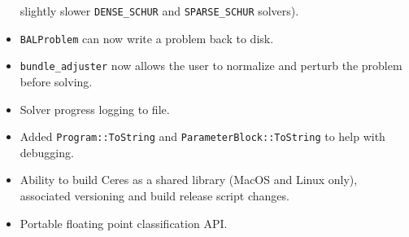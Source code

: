 \begin{itemize}
  slightly slower \texttt{DENSE\_SCHUR} and \texttt{SPARSE\_SCHUR} solvers).
\item \texttt{BALProblem} can now write a problem back to disk.
\item \texttt{bundle\_adjuster} now allows the user to normalize and perturb the
  problem before solving.
\item Solver progress logging to file.
\item Added \texttt{Program::ToString} and
  \texttt{ParameterBlock::ToString}  to help with debugging.
\item Ability to build Ceres as a shared library (MacOS and Linux only), associated versioning and build release script changes.
\item Portable floating point classification API.
\end{itemize}

